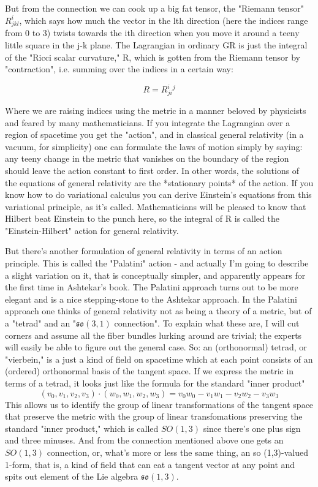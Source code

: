 But from the connection we can cook up a big fat tensor, the "Riemann tensor" $R^i_{jkl}$, which says how much the vector in the lth direction (here the indices range from 0 to 3) twists towards the ith direction when you move it around a teeny little square in the j-k plane. The Lagrangian in ordinary GR is just the integral of the "Ricci scalar curvature," R, which is gotten from the Riemann tensor by "contraction", i.e. summing over the indices in a certain way:

\[R = R^i_{ji}^j\]

Where we are raising indices using the metric in a manner beloved by physicists and feared by many mathematicians. If you integrate the Lagrangian over a region of spacetime you get the "action", and in classical general relativity (in a vacuum, for simplicity) one can formulate the laws of motion simply by saying: any teeny change in the metric that vanishes on the boundary of the region should leave the action constant to first order. In other words, the solutions of the equations of general relativity are the *stationary points* of the action. If you know how to do variational calculus you can derive Einstein's equations from this variational principle, as it's called. Mathematicians will be pleased to know that Hilbert beat Einstein to the punch here, so the integral of R is called the "Einstein-Hilbert" action for general relativity.

But there's another formulation of general relativity in terms of an action principle. This is called the "Palatini" action - and actually I'm going to describe a slight variation on it, that is conceptually simpler, and apparently appears for the first time in Ashtekar's book. The Palatini approach turns out to be more elegant and is a nice stepping-stone to the Ashtekar approach. In the Palatini approach one thinks of general relativity not as being a theory of a metric, but of a "tetrad" and an "$\mathfrak{so(3,1)}$ connection". To explain what these are, I will cut corners and assume all the fiber bundles lurking around are trivial; the experts will easily be able to figure out the general case. So: an (orthonormal) tetrad, or "vierbein," is a just a kind of field on spacetime which at each point consists of an (ordered) orthonormal basis of the tangent space. If we express the metric in terms of a tetrad, it looks just like the formula for the standard "inner product"
\[(v_0,v_1,v_2,v_3)\cdot(w_0,w_1,w_2,w_3) = v_0w_0 - v_1w_1 - v_2w_2 - v_3w_3\]
This allows us to identify the group of linear transformations of the tangent space that preserve the metric with the group of linear transfomations preserving the standard "inner product," which is called $SO(1,3)$ since there's one plus sign and three minuses. And from the connection mentioned above one gets an $SO(1,3)$ connection, or, what's more or less the same thing, an so (1,3)-valued 1-form, that is, a kind of field that can eat a tangent vector at any point and spits out element of the Lie algebra $\mathfrak{so}(1,3)$.

